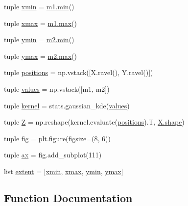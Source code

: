 \begin{DoxyCompactItemize}
\item 
tuple \hyperlink{namespacekde__plot5_a3dd7976b4e2ec0f5c0caddd6f3ded904}{xmin} = \hyperlink{vecbfn_8cc_aa3e27e02424d28adfcf9d2b934e741a1}{m1.\+min}()
\item 
tuple \hyperlink{namespacekde__plot5_ae089a34b18d3d9436eb7831c060b6905}{xmax} = \hyperlink{vecbfn_8cc_a71f214d4a304fdc2089c54dbaf979fe5}{m1.\+max}()
\item 
tuple \hyperlink{namespacekde__plot5_a7f07b544e2e02e62d83e39a988650d16}{ymin} = \hyperlink{vecbfn_8cc_aa3e27e02424d28adfcf9d2b934e741a1}{m2.\+min}()
\item 
tuple \hyperlink{namespacekde__plot5_a24bb72e67b6c830730f5ea7b1ef86504}{ymax} = \hyperlink{vecbfn_8cc_a71f214d4a304fdc2089c54dbaf979fe5}{m2.\+max}()
\item 
tuple \hyperlink{namespacekde__plot5_ab6cfa8207a0b393aa7c934ef92166aee}{positions} = np.\+vstack(\mbox{[}X.\+ravel(), Y.\+ravel()\mbox{]})
\item 
tuple \hyperlink{namespacekde__plot5_a2a7edba4c72b34ae11df3e471ff49c19}{values} = np.\+vstack(\mbox{[}m1, m2\mbox{]})
\item 
tuple \hyperlink{namespacekde__plot5_a2a73d0d23b62002acd1b8efe02cad412}{kernel} = stats.\+gaussian\+\_\+kde(\hyperlink{namespacekde__plot5_a2a7edba4c72b34ae11df3e471ff49c19}{values})
\item 
tuple \hyperlink{namespacekde__plot5_ac3ef56788a3a50a5ab137ed33dd008af}{Z} = np.\+reshape(kernel.\+evaluate(\hyperlink{namespacekde__plot5_ab6cfa8207a0b393aa7c934ef92166aee}{positions}).T, \hyperlink{shape_8h_a9d9da3dcaecbbde6cf1961063f2e838b}{X.\+shape})
\item 
tuple \hyperlink{namespacekde__plot5_a27469f49305b4d1711212695bd77fd59}{fig} = plt.\+figure(figsize=(8, 6))
\item 
tuple \hyperlink{namespacekde__plot5_a2d5cc10d5d5fe3ef7595c8c719b15305}{ax} = fig.\+add\+\_\+subplot(111)
\item 
list \hyperlink{namespacekde__plot5_a4e4fde437014749a7c75fc5e3fdb09ed}{extent} = \mbox{[}\hyperlink{namespacekde__plot5_a3dd7976b4e2ec0f5c0caddd6f3ded904}{xmin}, \hyperlink{namespacekde__plot5_ae089a34b18d3d9436eb7831c060b6905}{xmax}, \hyperlink{namespacekde__plot5_a7f07b544e2e02e62d83e39a988650d16}{ymin}, \hyperlink{namespacekde__plot5_a24bb72e67b6c830730f5ea7b1ef86504}{ymax}\mbox{]}
\end{DoxyCompactItemize}


\subsection{Function Documentation}
\hypertarget{namespacekde__plot5_a6be8978a5f58e8561839d8e21cc16518}{}
